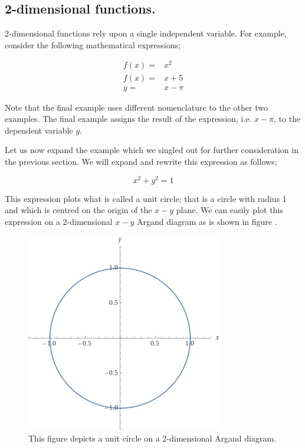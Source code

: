 \documentclass{article}
\begin{document}
\subsection{2-dimensional functions.}

2-dimensional functions rely upon a single independent variable. For example, consider the following mathematical
expressions;

\begin{align*}
f(x) =& x^{2} \\
f(x) =& x + 5 \\
y    =& x - \pi
\end{align*}

Note that the final example uses different nomenclature to the other two examples. The final example assigns the
result of the expression, i.e. $x - \pi$, to the dependent variable $y$.

Let us now expand the example which we singled out for further consideration in the previous section. We will
expand and rewrite this expression as follows;

\begin{equation}
x^{2} + y^{2} = 1
\end{equation}

This expression plots what is called a unit circle; that is a circle with radius 1 and which is centred on the origin 
of the $x-y$ plane. We can easily plot this expression on a 2-dimensional $x-y$ Argand diagram as is shown in figure .

\begin{figure}
  \begin{center}
  \includegraphics[scale=1.5]{images/Unit_circle.jpg}
  \end{center}
  \caption{This figure depicts a unit circle on a 2-dimensional Argand diagram.}
  \label{fig:Unit_circle}
\end{figure}
\end{document}
